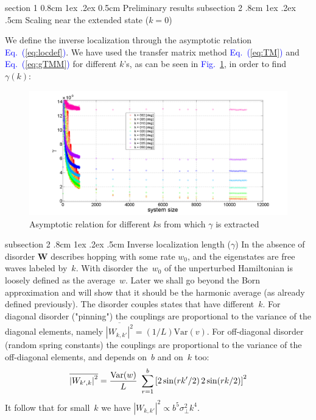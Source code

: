 \documentclass[onecolumn,fleqn,notitlepage,secnumarabic]{revtex4}
\makeatletter
\newcommand{\Eq}[1]{\textcolor{blue}{Eq.\!\!~(\ref{#1})}}
\newcommand{\Fig}[1]{\textcolor{blue}{Fig.}\!\!~\ref{#1}}
\newcommand{\be}[1]{\begin{eqnarray}\ifthenelse{#1=-1}{\nonumber}{\ifthenelse{#1=0}{}{\label{e#1}}}}
\newcommand{\ee}{\end{eqnarray}}
\newcommand{\beq}{\be{1}}
\newcommand{\eeq}{\ee}
\def\section{%
  \@startsection
    {section}%
    {1}%
    {\z@}%
    {0.8cm \@plus1ex \@minus .2ex}%
    {0.5cm}%
    {\Large\bf }%
}%
\def\subsection{%
  \@startsection
    {subsection}%
    {2}%
    {\z@}%
    {.8cm \@plus1ex \@minus .2ex}%
    {.5cm}%
    {\normalfont\small\bfseries}%
}%
\makeatother
\begin{document}
\section{Preliminary results} \label{sec:prelim}
\subsection{Scaling near the extended state ($k=0$)}

We define the inverse localization through the asymptotic relation \Eq{eq:locdef}. We have used the transfer matrix method \Eq{eq:TM} and \Eq{eq:gTMM} for different $k$'s, as can be seen in \Fig{fig:lyp}, in order to find $\gamma(k)$:

\begin{figure}[h]\label{fig:lyp}
\includegraphics[width=18cm]{gamma_N2.png}
\caption{\footnotesize Asymptotic relation for different $k$s from which $\gamma$ is extracted}
\end{figure}

\subsection{Inverse localization length ($\gamma$)}
%
In the absence of disorder $\bm{W}$ describes hopping 
with some rate $w_0$, and the eigenstates are free waves labeled by~$k$. 
With disorder the~$w_0$ of the unperturbed Hamiltonian is 
loosely defined as the average~$w$. Later we shall go beyond 
the Born approximation and will show that it should 
be the harmonic average (as already defined previously).   
%
The disorder couples states that have different~$k$. 
For diagonal disorder ("pinning") the couplings are proportional to the 
variance of the diagonal elements, 
namely ${ \overline{|W_{k,k'}|^2} = (1/L)\text{Var}(v)}$.
%
For off-diagonal disorder (random spring constants) 
the  couplings are proportional to the variance  of 
the off-diagonal elements, and depends on~$b$ and on~$k$ too:
%
\beq
\overline{\left|W_{k',k}\right|^2}  =  \frac{\text{Var}(w)}{L} \ \sum_{r=1}^{b} \left[2\sin(rk'/2) \, 2\sin(rk/2)\right]^2 
\eeq
%
It follow that for small~$k$ we have ${|W_{k,k'}|^2 \propto b^5 \sigma_{\perp}^2 k^4}$. 
\end{document}
